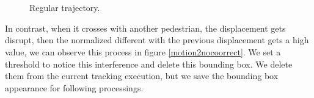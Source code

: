 \documentclass[12pt, a4paper, titlepage,twoside,openright]{article}
\begin{document}
\begin{figure}[H]
		
\centering

\\
\\
\caption{Regular trajectory.}
\label{motion2Correct}
\end{figure}


In contrast, when it crosses with another pedestrian, the displacement gets disrupt, then the normalized different with the previous displacement gets a high value, we can observe this process in figure \ref{motion2nocoorrect}. We set a threshold to notice this interference and delete this bounding box. We delete them from the current tracking execution, but we save the bounding box appearance for following processings.
\end{document}

